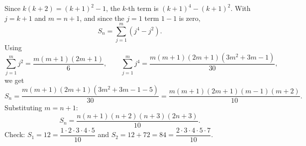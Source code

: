 Since $k(k+2)=(k+1)^2-1$, the $k$-th term is $(k+1)^4-(k+1)^2$. With $j=k+1$ and $m=n+1$, and since the $j=1$ term $1-1$ is zero,
\[S_n=\sum_{j=1}^{m}\left(j^4-j^2\right).\]
Using
\[\sum_{j=1}^{m}j^2=\dfrac{m(m+1)(2m+1)}{6},\qquad\sum_{j=1}^{m}j^4=\dfrac{m(m+1)(2m+1)\left(3m^2+3m-1\right)}{30},\]
we get
\[S_n=\dfrac{m(m+1)(2m+1)\left(3m^2+3m-1-5\right)}{30}=\dfrac{m(m+1)(2m+1)(m-1)(m+2)}{10}.\]
Substituting $m=n+1$:
\[S_n=\boxed{\dfrac{n(n+1)(n+2)(n+3)(2n+3)}{10}}.\]
Check: $S_1=12=\dfrac{1\cdot2\cdot3\cdot4\cdot5}{10}$ and $S_2=12+72=84=\dfrac{2\cdot3\cdot4\cdot5\cdot7}{10}$.
